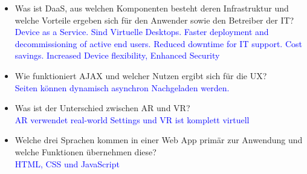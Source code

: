 \begin{itemize}
    \item Was ist DaaS, aus welchen Komponenten besteht deren Infrastruktur und welche Vorteile ergeben sich für den Anwender sowie den Betreiber der IT? \\
    \textcolor{blue}{Device as a Service. Sind Virtuelle Desktops. Faster deployment and decommissioning of active end users. Reduced downtime for IT support. Cost savings. Increased Device flexibility, Enhanced Security}
    \item Wie funktioniert AJAX und welcher Nutzen ergibt sich für die UX? \\
    \textcolor{blue}{Seiten können dynamisch asynchron Nachgeladen werden.}
    \item Was ist der Unterschied zwischen AR und VR? \\
    \textcolor{blue}{AR verwendet real-world Settings und VR ist komplett virtuell}
    \item Welche drei Sprachen kommen in einer Web App primär zur Anwendung und welche Funktionen übernehmen diese? \\
    \textcolor{blue}{HTML, CSS und JavaScript}
\end{itemize}
